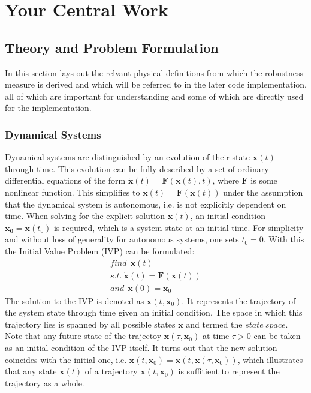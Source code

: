 \chapter{Your Central Work}

\section{Theory and Problem Formulation}

    In this section lays out the relvant physical definitions from which the robustness measure is derived and which will be referred to in the later code implementation. all of which are important for understanding and some of which are directly used for the implementation. 

\subsection{Dynamical Systems} \label{dynamicstheory}
    
    Dynamical systems are distinguished by an evolution of their state $\mathbf{x}(t)$ through time. This evolution can be fully described by a set of ordinary differential equations of the form $\dot{\mathbf{x}}(t) = \mathbf{F}(\mathbf{x}(t),t)$, where $\mathbf{F}$ is some nonlinear function. This simplifies to $\dot{\mathbf{x}}(t) = \mathbf{F}(\mathbf{x}(t))$ under the assumption that the dynamical system is autonomous, i.e. is not explicitly dependent on time. 
    When solving for the explicit solution $\mathbf{x}(t)$, an initial condition $\mathbf{x_0}=\mathbf{x}(t_0)$ is required, which is a system state at an initial time. For simplicity and without loss of generality for autonomous systems, one sets $t_0 = 0$. With this the Initial Value Problem (IVP) can be formulated: \begin{gather} \label{eq:1} find \ \ \mathbf{x}(t) \\ s.t. \ \dot{\mathbf{x}}(t) = \mathbf{F}(\mathbf{x}(t)) \\ and \ \ \mathbf{x}(0) = \mathbf{x}_0 \end{gather}
    The solution to the IVP is denoted as $\mathbf{x}(t,\mathbf{x}_0)$. It represents the trajectory of the system state through time given an initial condition. The space in which this trajectory lies is spanned by all possible states $\mathbf{x}$ and termed the $state\ space$. Note that any future state of the trajectoy $\mathbf{x}(\tau,\mathbf{x}_0)$ at time $\tau > 0$ can be taken as an initial condition of the IVP itself. It turns out that the new solution coincides with the initial one, i.e. $\mathbf{x}(t,\mathbf{x}_0) = \mathbf{x}(t,\mathbf{x}(\tau,\mathbf{x}_0))$, which illustrates that any state $\mathbf{x}(t)$ of a trajectory $\mathbf{x}(t,\mathbf{x}_0)$ is suffitient to represent the trajectory as a whole.
    
